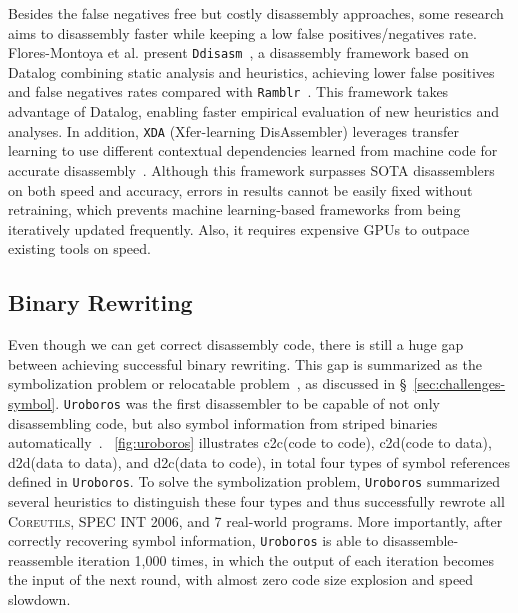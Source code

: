 Besides the false negatives free but costly disassembly approaches, some research aims to disassembly faster while keeping a low false positives/negatives rate. Flores-Montoya et al. present \texttt{Ddisasm}~\cite{flores2020datalog}, a disassembly framework based on Datalog combining static analysis and heuristics, achieving lower false positives and false negatives rates compared with \texttt{Ramblr}~\cite{wang2017ramblr}. This framework takes advantage of Datalog, enabling faster empirical evaluation of new heuristics and analyses.
In addition, \texttt{XDA} (Xfer-learning DisAssembler) leverages transfer learning to use different contextual dependencies learned from machine code for accurate disassembly~\cite{pei2020xda}. Although this framework surpasses SOTA disassemblers on both speed and accuracy, errors in results cannot be easily fixed without retraining, which prevents machine learning-based frameworks from being iteratively updated frequently. Also, it requires expensive GPUs to outpace existing tools on speed.

\subsection{Binary Rewriting} \label{sec:existing-symbolization}
Even though we can get correct disassembly code, there is still a huge gap between achieving successful binary rewriting. This gap is summarized as the symbolization problem or relocatable problem~\cite{wang2015reassembleable,wang2017ramblr}, as discussed in \S~\ref{sec:challenges-symbol}. \texttt{Uroboros} was the first disassembler to be capable of not only disassembling code, but also symbol information from striped binaries automatically~\cite{wang2015reassembleable}. \F~\ref{fig:uroboros} illustrates c2c(code to code), c2d(code to data), d2d(data to data), and d2c(data to code), in total four types of symbol references defined in \texttt{Uroboros}. To solve the symbolization problem, \texttt{Uroboros} summarized several heuristics to distinguish these four types and thus successfully rewrote all \textsc{Coreutils}, \textsc{SPEC INT 2006}, and 7 real-world programs. More importantly, after correctly recovering symbol information, \texttt{Uroboros} is able to disassemble-reassemble iteration 1,000 times, in which the output of each iteration becomes the input of the next round, with almost zero code size explosion and speed slowdown.

